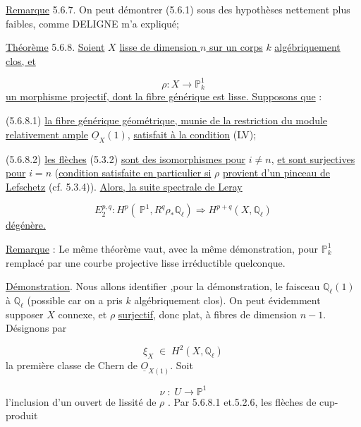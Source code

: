 \underline{Remarque} 5.6.7. On peut démontrer (5.6.1) sous des hypothèses nettement plus faibles, comme DELIGNE m'a expliqué;

\underline{Théorème} 5.6.8. \underline{Soient} $X$ \underline{lisse de dimension $n$ sur un corps} $k$ \underline{algébriquement clos, et}

\begin{equation*}
\rho : X \longrightarrow \mathbb{P}^1_k
\end{equation*}
\underline{un morphisme projectif, dont la fibre générique est lisse. Supposons que} :

(5.6.8.1) \underline{la fibre générique géométrique, munie de la restriction du module relativement ample} $\underline{O}_X(1)$, \underline{satisfait à la condition} (LV);

(5.6.8.2) \underline{les flèches} (5.3.2) \underline{sont des isomorphismes pour} $i \neq n$, \underline{et sont surjectives pour} $i = n$ (\underline{condition satisfaite en particulier si} $\rho$ \underline{provient d'un pinceau de Lefschetz} (cf. 5.3.4)). \underline{Alors, la suite spectrale de Leray}

\begin{equation*}
E_2^{p,q} : H^p(\ \mathbb{P}^1,R^q\rho_*\mathbb{Q}_{\ell}) \Longrightarrow H^{p+q}(X,\mathbb{Q}_{\ell})
\end{equation*}
\underline{dégénère.}

\underline{Remarque} : Le même théorème vaut, avec la même démonstration, pour $\mathbb{P}^1_k$ remplacé par une courbe projective lisse irréductible quelconque.



\underline{Démonstration}. Nous allons identifier ,pour la démonstration, le faisceau $\mathbb{Q}_\ell(1)$ à $\mathbb{Q}_\ell$ (possible car on a pris $k$ algébriquement clos). On peut évidemment supposer $X$ connexe, et $\rho$ \underline{surjectif}, donc plat, à fibres de dimension $n-1$. Désignons par

\begin{equation*}
\xi_X \; \in \; H^2(X,\mathbb{Q}_\ell)
\end{equation*}
la première classe de Chern de $\underline{O}_{X(1)}$. Soit

\begin{equation*}
\nu \; : \; U \longrightarrow \mathbb{P}^1
\end{equation*}
l'inclusion d'un ouvert de lissité de $\rho$ . Par 5.6.8.1 et.5.2.6, les flèches de cup-produit

